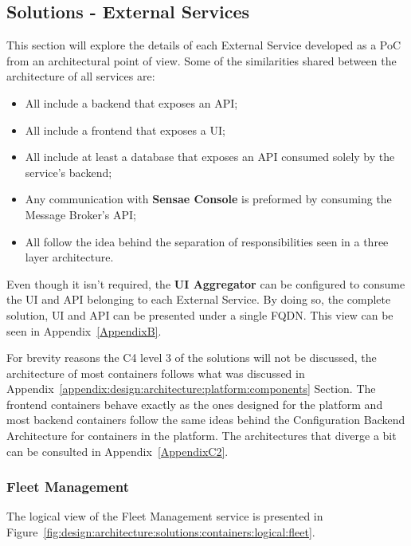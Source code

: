\subsection{Solutions - External Services}
\label{subsec:design:architecture:solutions}

This section will explore the details of each External Service developed as a \gls{PoC} from an architectural point of view.
Some of the similarities shared between the architecture of all services are:

\begin{itemize}
   \item All include a backend that exposes an \gls{API};
   \item All include a frontend that exposes a \gls{UI};
   \item All include at least a database that exposes an \gls{API} consumed solely by the service's backend;
   \item Any communication with \textbf{Sensae Console} is preformed by consuming the Message Broker's \gls{API};
   \item All follow the idea behind the separation of responsibilities seen in a three layer architecture.
\end{itemize}

Even though it isn't required, the \textbf{UI Aggregator} can be configured to consume the \gls{UI} and \gls{API} belonging to each External Service. By doing so, the complete solution, \gls{UI} and \gls{API} can be presented under a single \gls{FQDN}. This view can be seen in Appendix~\ref{AppendixB}.

For brevity reasons the C4 level 3 of the solutions will not be discussed, the architecture of most containers follows what was discussed in Appendix~\ref{appendix:design:architecture:platform:components} Section. The frontend containers behave exactly as the ones designed for the platform and most backend containers follow the same ideas behind the Configuration Backend Architecture for containers in the platform. The architectures that diverge a bit can be consulted in Appendix~\ref{AppendixC2}.

\subsubsection{Fleet Management}
\label{subsubsec:design:architecture:solutions:fleet}

The logical view of the Fleet Management service is presented in Figure~\ref{fig:design:architecture:solutions:containers:logical:fleet}.

